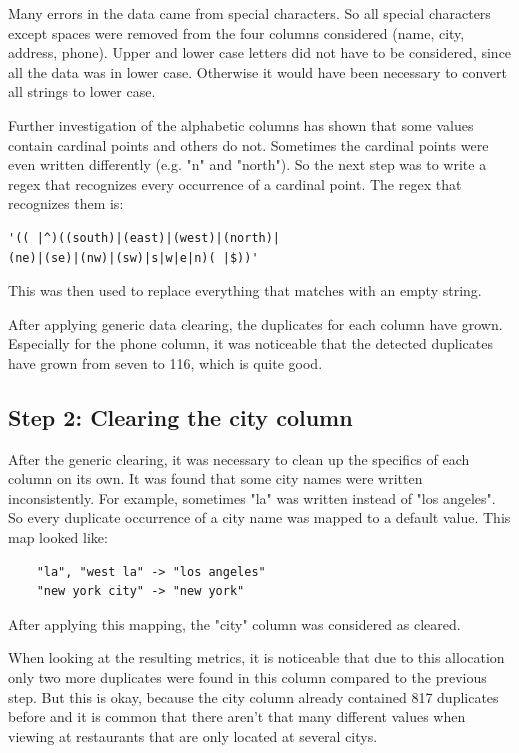 \documentclass[conference]{IEEEtran}
\begin{document}
Many errors in the data came from special characters. So all special characters except spaces were removed from the four columns considered (name, city, address, phone). Upper and lower case letters did not have to be considered, since all the data was in lower case. Otherwise it would have been necessary to convert all strings to lower case.

Further investigation of the alphabetic columns has shown that some values contain cardinal points and others do not. Sometimes the cardinal points were even written differently (e.g. "n" and "north"). So the next step was to write a regex that recognizes every occurrence of a cardinal point. The regex that recognizes them is: 
\begin{lstlisting}
'(( |^)((south)|(east)|(west)|(north)|
(ne)|(se)|(nw)|(sw)|s|w|e|n)( |$))'
\end{lstlisting}
This was then used to replace everything that matches with an empty string.

After applying generic data clearing, the duplicates for each column have grown. Especially for the phone column, it was noticeable that the detected duplicates have grown from seven to 116, which is quite good.
\subsection{Step 2: Clearing the city column}
After the generic clearing, it was necessary to clean up the specifics of each column on its own. It was found that some city names were written inconsistently. For example, sometimes "la" was written instead of "los angeles". So every duplicate occurrence of a city name was mapped to a default value. This map looked like: 
\begin{lstlisting}
	"la", "west la" -> "los angeles"
	"new york city" -> "new york"
\end{lstlisting}
After applying this mapping, the "city" column was considered as cleared.

When looking at the resulting metrics, it is noticeable that due to this allocation only two more duplicates were found in this column compared to the previous step. But this is okay, because the city column already contained 817 duplicates before and it is common that there aren't that many different values when viewing at restaurants that are only located at several citys.
\end{document}
